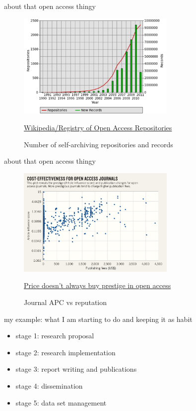 \documentclass[10pt]{beamer}
\begin{document}
\begin{frame}{about that open access thingy}
	\begin{figure}[!ht]
  	\centering
  	\includegraphics[width=3in]{self_archive_Roar2011.png}
    \caption{Number of self-archiving repositories and records}{\href{https://en.wikipedia.org/wiki/Registry_of_Open_Access_Repositories}{Wikipedia/Registry of Open Access Repositories}}
	\end{figure}
\end{frame}

\begin{frame}{about that open access thingy}
	\begin{figure}[!ht]
  	\centering
  	\includegraphics[width=3in]{Article_influence_chart.jpg}
    \caption{Journal APC vs reputation}{\href{http://www.nature.com/news/price-doesn-t-always-buy-prestige-in-open-access-1.12259}{Price doesn't always buy prestige in open access}}
	\end{figure}
\end{frame}

\begin{frame}{my example: what I am starting to do and keeping it as habit}
  \begin{itemize}
  	\item stage 1: research proposal
    \item stage 2: research implementation
    \item stage 3: report writing and publications
    \item stage 4: dissemination
    \item stage 5: data set management
  \end{itemize}
\end{frame}
\end{document}
